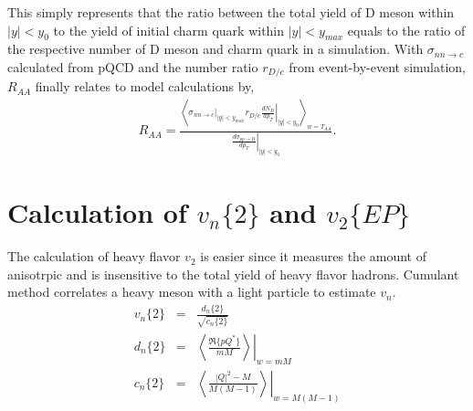 \documentclass[10pt,a4paper]{article}
\newcommand{\Raa}{R_{AA}}
\begin{document}
This simply represents that the ratio between the total yield of D meson within $|y|<y_0$ to the yield of initial charm quark within $|y| < y_{max}$ equals to the ratio of the respective number of D meson and charm quark in a simulation.
With $\sigma_{nn\rightarrow c}$ calculated from pQCD and the number ratio $r_{D/c}$ from event-by-event simulation, $\Raa$ finally relates to model calculations by,
\begin{eqnarray}
\Raa = \frac{\left\langle \left.\sigma_{nn\rightarrow c} \right|_{|y|<y_{max}} r_{D/c} \left.\frac{d N_D}{dp_T} \right|_{|y|<y_0} \right\rangle_{w=T_{AA}}}{\left.  \frac{d\sigma_{pp \rightarrow D}}{dp_T}\right|_{|y|<y_0}}.
\end{eqnarray}

\section{Calculation of $v_n\{2\}$ and $v_2\{EP\}$}
The calculation of heavy flavor $v_2$ is easier since it measures the amount of anisotrpic and is insensitive to the total yield of heavy flavor hadrons.
Cumulant method correlates a heavy meson with a light particle to estimate $v_n$.
\begin{eqnarray}
v_n\{2\} &=& \frac{d_n\{2\}}{\sqrt{c_n\{2\}} } \\
d_n\{2\} &=& \left.\left\langle \frac{\Re\{pQ^*\}}{mM} \right\rangle\right|_{w = mM} \\
c_n\{2\} &=& \left.\left\langle \frac{|Q|^2-M}{M(M-1)} \right\rangle\right|_{w = M(M-1)}
\end{eqnarray}
\end{document}
